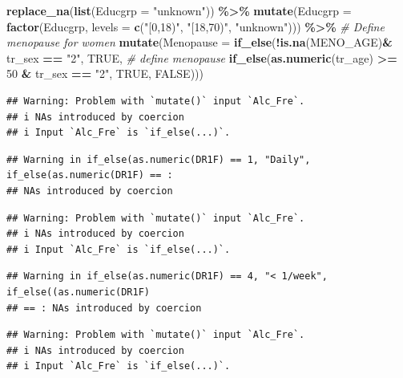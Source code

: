 \documentclass[
]{article}
\newenvironment{Shaded}{\begin{snugshade}}{\end{snugshade}}
\newcommand{\CommentTok}[1]{\textcolor[rgb]{0.56,0.35,0.01}{\textit{#1}}}
\newcommand{\DataTypeTok}[1]{\textcolor[rgb]{0.13,0.29,0.53}{#1}}
\newcommand{\DecValTok}[1]{\textcolor[rgb]{0.00,0.00,0.81}{#1}}
\newcommand{\KeywordTok}[1]{\textcolor[rgb]{0.13,0.29,0.53}{\textbf{#1}}}
\newcommand{\NormalTok}[1]{#1}
\newcommand{\OperatorTok}[1]{\textcolor[rgb]{0.81,0.36,0.00}{\textbf{#1}}}
\newcommand{\OtherTok}[1]{\textcolor[rgb]{0.56,0.35,0.01}{#1}}
\newcommand{\StringTok}[1]{\textcolor[rgb]{0.31,0.60,0.02}{#1}}
\begin{document}
\begin{Shaded}
\begin{Highlighting}[]
\StringTok{  }\KeywordTok{replace\_na}\NormalTok{(}\KeywordTok{list}\NormalTok{(}\DataTypeTok{Educgrp =} \StringTok{"unknown"}\NormalTok{)) }\OperatorTok{\%\textgreater{}\%}\StringTok{ }
\StringTok{  }\KeywordTok{mutate}\NormalTok{(}\DataTypeTok{Educgrp =} \KeywordTok{factor}\NormalTok{(Educgrp, }\DataTypeTok{levels =} \KeywordTok{c}\NormalTok{(}\StringTok{"[0,18)"}\NormalTok{,}
                                              \StringTok{"[18,70)"}\NormalTok{,}
                                              \StringTok{"unknown"}\NormalTok{))) }\OperatorTok{\%\textgreater{}\%}\StringTok{ }\CommentTok{\# Define menopause for women}
\StringTok{  }\KeywordTok{mutate}\NormalTok{(}\DataTypeTok{Menopause =} \KeywordTok{if\_else}\NormalTok{(}\OperatorTok{!}\KeywordTok{is.na}\NormalTok{(MENO\_AGE)}\OperatorTok{\&}\StringTok{ }\NormalTok{tr\_sex }\OperatorTok{==}\StringTok{ "2"}\NormalTok{, }\OtherTok{TRUE}\NormalTok{,  }\CommentTok{\# define menopause}
                             \KeywordTok{if\_else}\NormalTok{(}\KeywordTok{as.numeric}\NormalTok{(tr\_age) }\OperatorTok{\textgreater{}=}\StringTok{ }\DecValTok{50} \OperatorTok{\&}\StringTok{ }\NormalTok{tr\_sex }\OperatorTok{==}\StringTok{ "2"}\NormalTok{, }
                                     \OtherTok{TRUE}\NormalTok{, }\OtherTok{FALSE}\NormalTok{)))}
\end{Highlighting}
\end{Shaded}

\begin{verbatim}
## Warning: Problem with `mutate()` input `Alc_Fre`.
## i NAs introduced by coercion
## i Input `Alc_Fre` is `if_else(...)`.
\end{verbatim}

\begin{verbatim}
## Warning in if_else(as.numeric(DR1F) == 1, "Daily", if_else(as.numeric(DR1F) == :
## NAs introduced by coercion
\end{verbatim}

\begin{verbatim}
## Warning: Problem with `mutate()` input `Alc_Fre`.
## i NAs introduced by coercion
## i Input `Alc_Fre` is `if_else(...)`.
\end{verbatim}

\begin{verbatim}
## Warning in if_else(as.numeric(DR1F) == 4, "< 1/week", if_else((as.numeric(DR1F)
## == : NAs introduced by coercion
\end{verbatim}

\begin{verbatim}
## Warning: Problem with `mutate()` input `Alc_Fre`.
## i NAs introduced by coercion
## i Input `Alc_Fre` is `if_else(...)`.
\end{verbatim}
\end{document}
